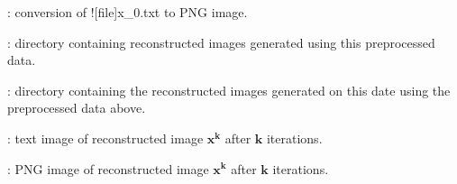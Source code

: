 \begin{tcbenvironment}
\begin{tcbparagraph}
\begin{ThinEnum}
\begin{ThinEnum}
\begin{ThinEnum}
\begin{ThinEnum}
\begin{ThinEnum}
\begin{ThinEnum}
\begin{ThinEnum}
\begin{ThinEnum}
\begin{ThinEnum}
                                        \item {} : conversion of \docentry![file]{x\_0.txt} to PNG image.
                                        \item {} : directory containing reconstructed images generated using this preprocessed data.
                                        \begin{ThinEnum}
                                            \item {} : directory containing the reconstructed images generated on this date using the preprocessed data above.
                                                \begin{ThinEnum}
                                                    \item {} : text image of reconstructed image $\boldsymbol{x^k}$ after $\boldsymbol{k}$ iterations.
                                                    \item {} : PNG image of reconstructed image $\boldsymbol{x^k}$ after $\boldsymbol{k}$ iterations.
                                                \end{ThinEnum}
                                        \end{ThinEnum}
                                    \end{ThinEnum}
                                \end{ThinEnum}
                            \end{ThinEnum}
                        \end{ThinEnum}
                    \end{ThinEnum}
                \end{ThinEnum}
            \end{ThinEnum}
        \end{ThinEnum}
    \end{ThinEnum}
\end{tcbparagraph}
\end{tcbenvironment}
